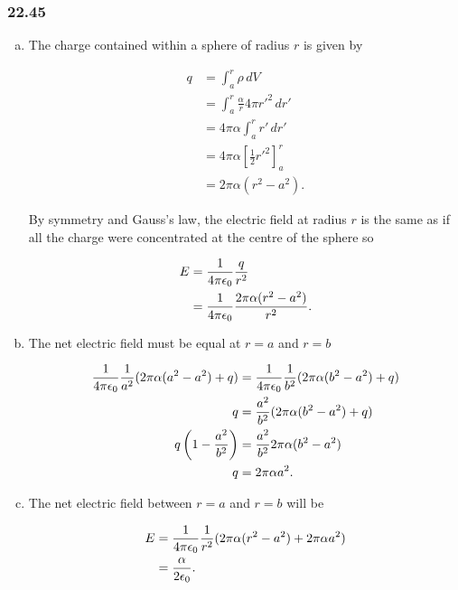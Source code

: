 \documentclass{article}
\begin{document}
\subsubsection{22.45}

\begin{enumerate}[a)]
  \item The charge contained within a sphere of radius $r$ is given by

        \begin{align*}
          q & = \int_a^r \rho \, dV                              \\
            & = \int_a^r \frac{\alpha}{r} 4 \pi r'^2 \, dr'      \\
            & = 4 \pi \alpha \int_a^r r' \, dr'                  \\
            & = 4 \pi \alpha \left[ \frac{1}{2} r'^2 \right]_a^r \\
            & = 2 \pi \alpha (r^2 - a^2).
        \end{align*}

        By symmetry and Gauss's law, the electric field at radius $r$ is the same as if all the charge were concentrated at the centre of the sphere so

        \begin{align*}
          E & = \frac{1}{4 \pi \epsilon_0} \frac{q}{r^2}                         \\
            & = \frac{1}{4 \pi \epsilon_0} \frac{2 \pi \alpha (r^2 - a^2)}{r^2}.
        \end{align*}

  \item The net electric field must be equal at $r=a$ and $r=b$

        \begin{align*}
          \frac{1}{4 \pi \epsilon_0} \frac{1}{a^2} (2 \pi \alpha (a^2 - a^2) + q) & = \frac{1}{4 \pi \epsilon_0} \frac{1}{b^2} (2 \pi \alpha (b^2 - a^2) + q) \\
          q                                                & = \frac{a^2}{b^2} (2 \pi \alpha (b^2 - a^2) + q)   \\
          q \left(1 - \frac{a^2}{b^2}\right)               & = \frac{a^2}{b^2} 2 \pi \alpha (b^2 - a^2)         \\
          q                                                & = 2 \pi \alpha a^2.
        \end{align*}

  \item The net electric field between $r=a$ and $r=b$ will be

        \begin{align*}
          E & = \frac{1}{4 \pi \epsilon_0} \frac{1}{r^2} (2 \pi \alpha (r^2 - a^2) + 2 \pi \alpha a^2) \\
            & = \frac{\alpha}{2 \epsilon_0}.
        \end{align*}
\end{enumerate}
\end{document}
